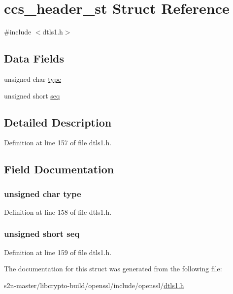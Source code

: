 \hypertarget{structccs__header__st}{}\section{ccs\+\_\+header\+\_\+st Struct Reference}
\label{structccs__header__st}


{\ttfamily \#include $<$dtls1.\+h$>$}

\subsection*{Data Fields}
\begin{DoxyCompactItemize}
\item 
unsigned char \hyperlink{structccs__header__st_aa5044999f3339d2ba3b1bf22fa6cfe95}{type}
\item 
unsigned short \hyperlink{structccs__header__st_ae3912cd83da227c65c49a73665d30e15}{seq}
\end{DoxyCompactItemize}


\subsection{Detailed Description}


Definition at line 157 of file dtls1.\+h.



\subsection{Field Documentation}
\subsubsection[{\texorpdfstring{type}{type}}]{\setlength{\rightskip}{0pt plus 5cm}unsigned char type}\hypertarget{structccs__header__st_aa5044999f3339d2ba3b1bf22fa6cfe95}{}\label{structccs__header__st_aa5044999f3339d2ba3b1bf22fa6cfe95}


Definition at line 158 of file dtls1.\+h.

\subsubsection[{\texorpdfstring{seq}{seq}}]{\setlength{\rightskip}{0pt plus 5cm}unsigned short seq}\hypertarget{structccs__header__st_ae3912cd83da227c65c49a73665d30e15}{}\label{structccs__header__st_ae3912cd83da227c65c49a73665d30e15}


Definition at line 159 of file dtls1.\+h.



The documentation for this struct was generated from the following file\+:\begin{DoxyCompactItemize}
\item 
s2n-\/master/libcrypto-\/build/openssl/include/openssl/\hyperlink{include_2openssl_2dtls1_8h}{dtls1.\+h}\end{DoxyCompactItemize}
